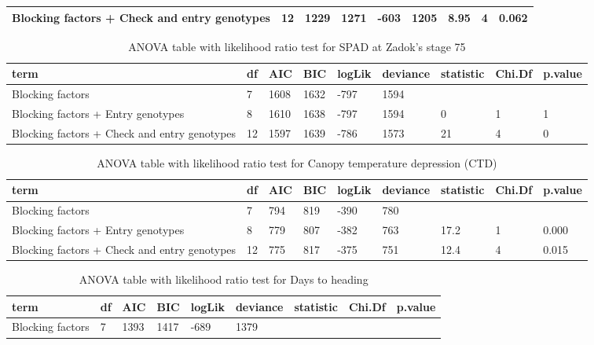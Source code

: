 \documentclass[12pt,oneside]{dukestatscithesis} %
\theoremstyle{definition}
\theoremstyle{definition}
\theoremstyle{definition}
\theoremstyle{remark}
\begin{document}
\begin{table}[H]
\begin{tabular}[t]{>{\raggedright\arraybackslash}p{3.5cm}llllllll}
Blocking factors + Check and entry genotypes & 12 & 1229 & 1271 & -603 & 1205 & 8.95 & 4 & 0.062\\
\bottomrule
\end{tabular}
\end{table}\begin{table}[H]
\caption{\label{tab:unnamed-chunk-5}\label{tab:lrt-spadii}ANOVA table with likelihood ratio test for SPAD at Zadok's stage 75}
\centering
\begin{tabular}[t]{>{\raggedright\arraybackslash}p{3.5cm}llllllll}
\toprule
term & df & AIC & BIC & logLik & deviance & statistic & Chi.Df & p.value\\
\midrule
Blocking factors & 7 & 1608 & 1632 & -797 & 1594 &  &  & \\
Blocking factors + Entry genotypes & 8 & 1610 & 1638 & -797 & 1594 & 0 & 1 & 1\\
Blocking factors + Check and entry genotypes & 12 & 1597 & 1639 & -786 & 1573 & 21 & 4 & 0\\
\bottomrule
\end{tabular}
\end{table}\begin{table}[H]
\caption{\label{tab:unnamed-chunk-5}\label{tab:lrt-ctd}ANOVA table with likelihood ratio test for Canopy temperature depression (CTD)}
\centering
\begin{tabular}[t]{>{\raggedright\arraybackslash}p{3.5cm}llllllll}
\toprule
term & df & AIC & BIC & logLik & deviance & statistic & Chi.Df & p.value\\
\midrule
Blocking factors & 7 & 794 & 819 & -390 & 780 &  &  & \\
Blocking factors + Entry genotypes & 8 & 779 & 807 & -382 & 763 & 17.2 & 1 & 0.000\\
Blocking factors + Check and entry genotypes & 12 & 775 & 817 & -375 & 751 & 12.4 & 4 & 0.015\\
\bottomrule
\end{tabular}
\end{table}\begin{table}[H]
\caption{\label{tab:unnamed-chunk-5}\label{tab:lrt-dth}ANOVA table with likelihood ratio test for Days to heading}
\centering
\begin{tabular}[t]{>{\raggedright\arraybackslash}p{3.5cm}llllllll}
\toprule
term & df & AIC & BIC & logLik & deviance & statistic & Chi.Df & p.value\\
\midrule
Blocking factors & 7 & 1393 & 1417 & -689 & 1379 &  &  & \\

\end{tabular}
\end{table}
\end{document}
